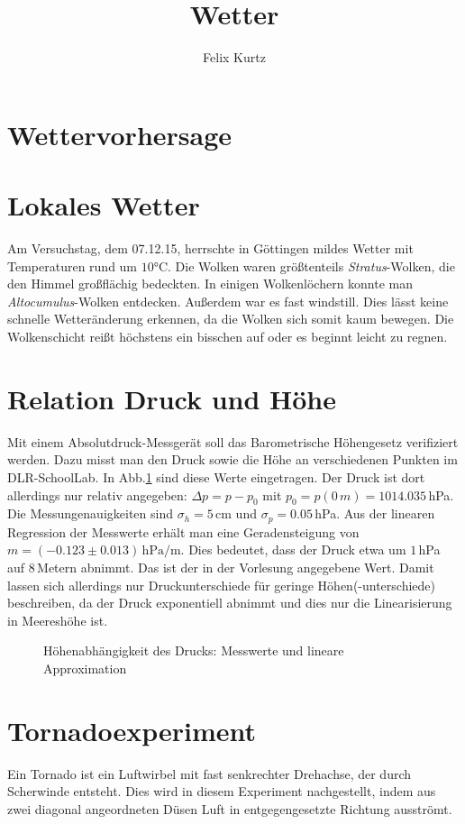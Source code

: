 \documentclass[12pt,a4paper,headinclude,bibtotoc]{scrartcl}
\begin{document}
\title{Wetter}
\author{Felix Kurtz}
\maketitle

\section{Wettervorhersage}

\section{Lokales Wetter}
Am Versuchstag, dem 07.12.15, herrschte in Göttingen mildes Wetter mit Temperaturen rund um $10\si{\celsius}$.
Die Wolken waren größtenteils \textit{Stratus}-Wolken, die den Himmel großflächig bedeckten.
In einigen Wolkenlöchern konnte man \textit{Altocumulus}-Wolken entdecken.
Außerdem war es fast windstill. 
Dies lässt keine schnelle Wetteränderung erkennen, da die Wolken sich somit kaum bewegen.
Die Wolkenschicht reißt höchstens ein bisschen auf oder es beginnt leicht zu regnen.

\section{Relation Druck und Höhe}
Mit einem Absolutdruck-Messgerät soll das Barometrische Höhengesetz verifiziert werden.
Dazu misst man den Druck sowie die Höhe an verschiedenen Punkten im DLR-SchoolLab.
In Abb.\ref{fig:druckHoehe} sind diese Werte eingetragen.
Der Druck ist dort allerdings nur relativ angegeben: $\Delta p = p-p_0$ mit $p_0=p(0\,\si{m})=1014.035\,$hPa.
Die Messungenauigkeiten sind $\sigma_h=5\,$cm und $\sigma_p=0.05\,$hPa.
Aus der linearen Regression der Messwerte erhält man eine Geradensteigung von $m=(-0.123 \pm 0.013)\,\si{\hecto\pascal\per\meter}$.
Dies bedeutet, dass der Druck etwa um $1\,$hPa auf $8\,$Metern abnimmt.
Das ist der in der Vorlesung angegebene Wert.
Damit lassen sich allerdings nur Druckunterschiede für geringe Höhen(-unterschiede) beschreiben, da der Druck exponentiell abnimmt und dies nur die Linearisierung in Meereshöhe ist.
\begin{figure}[!htb]
	\centering
	
	\caption{Höhenabhängigkeit des Drucks: Messwerte und lineare Approximation}
	\label{fig:druckHoehe}
\end{figure}

\section{Tornadoexperiment}
Ein Tornado ist ein Luftwirbel mit fast senkrechter Drehachse, der durch Scherwinde entsteht.
Dies wird in diesem Experiment nachgestellt, indem aus zwei diagonal angeordneten Düsen Luft in entgegengesetzte Richtung ausströmt.
\end{document}
